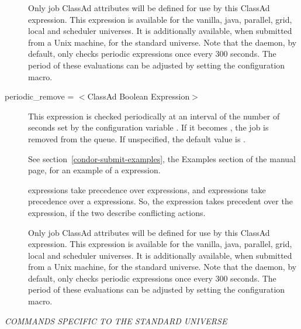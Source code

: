 \begin{description}
Only job ClassAd attributes will be defined for use by this ClassAd expression.
This expression is available for the vanilla, java, parallel, grid,
local and scheduler universes.
It is additionally available, when submitted from a Unix machine,
for the standard universe.  Note that the  daemon,
by default, only checks
periodic expressions once every 300 seconds.  The period of
these evaluations can be adjusted by setting the
 configuration macro.


\label{condor-submit-periodic-remove}
\item[periodic\_remove = $<$ClassAd Boolean Expression$>$]
This expression is checked periodically at an interval of
the number of seconds set by
the configuration variable .
If it becomes , the job is removed from the queue.
If unspecified, the default value is .

See section~\ref{condor-submit-examples},
the Examples section of the  manual page,
for an example of a  expression.

 expressions take
precedence over  expressions,
and  expressions take
precedence over a  expressions.
So, the  expression takes precedent over
the  expression,
if the two describe conflicting actions.

Only job ClassAd attributes will be defined for use by this ClassAd expression.
This expression is available for the vanilla, java, parallel, grid,
local and scheduler universes.
It is additionally available, when submitted from a Unix machine,
for the standard universe.  Note that the  daemon,
by default, only checks
periodic expressions once every 300 seconds.  The period of
these evaluations can be adjusted by setting the
 configuration macro.

\end{description} 



\emph{COMMANDS SPECIFIC TO THE STANDARD UNIVERSE}

